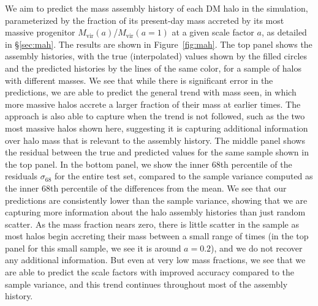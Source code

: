We aim to predict the mass assembly history of each DM halo in the \dark simulation, parameterized by the fraction of its present-day mass accreted by its most massive progenitor $M_\mathrm{vir}(a)$/$M_\mathrm{vir}(a=1)$ at a given scale factor $a$, as detailed in \S\ref{sec:mah}.
The results are shown in Figure~\ref{fig:mah}.
The top panel shows the assembly histories, with the true (interpolated) values shown by the filled circles and the predicted histories by the lines of the same color, for a sample of halos with different masses.
We see that while there is significant error in the predictions, we are able to predict the general trend with mass seen, in which more massive halos accrete a larger fraction of their mass at earlier times.
The approach is also able to capture when the trend is not followed, such as the two most massive halos shown here, suggesting it is capturing additional information over halo mass that is relevant to the assembly history.
The middle panel shows the residual between the true and predicted values for the same sample shown in the top panel.
In the bottom panel, we show the inner 68th percentile of the residuals $\sigma_{68}$ for the entire test set, compared to the sample variance computed as the inner 68th percentile of the differences from the mean.
We see that our predictions are consistently lower than the sample variance, showing that we are capturing more information about the halo assembly histories than just random scatter.
As the mass fraction nears zero, there is little scatter in the sample as most halos begin accreting their mass between a small range of times (in the top panel for this small sample, we see it is around $a=0.2$), and we do not recover any additional information.
But even at very low mass fractions, we see that we are able to predict the scale factors with improved accuracy compared to the sample variance, and this trend continues throughout most of the assembly history.

